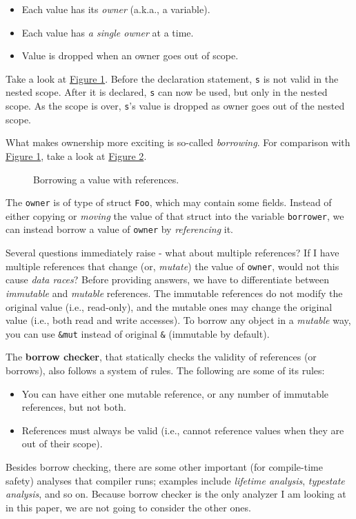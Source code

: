 \begin{itemize}
    \item Each value has its \textit{owner} (a.k.a., a variable).
    \item Each value has \textit{a single owner} at a time.
    \item Value is dropped when an owner goes out of scope.
\end{itemize}

Take a look at \hyperref[rustex1]{Figure 1}. Before the declaration statement,
\texttt{s} is not valid in the nested scope. After it is declared, 
\texttt{s} can now be used, but only in the nested scope. As the scope
is over, \texttt{s}'s value is dropped as owner goes out of the nested scope.

What makes ownership more exciting is so-called \textit{borrowing}. For comparison
with \hyperref[rustex1]{Figure 1}, take a look at \hyperref[rustex2]{Figure 2}.

\begin{figure*}[ht]
    \begin{center}
    
    \end{center}
    \caption{Borrowing a value with references.}
    \label{rustex2}
\end{figure*}

The \texttt{owner} is of type of struct \texttt{Foo}, which may contain some fields.
Instead of either copying or \textit{moving} the value of that struct into the variable
\texttt{borrower}, we can instead borrow a value of \texttt{owner} by \textit{referencing}
it.

Several questions immediately raise - what about multiple references? If I have 
multiple references that change (or, \textit{mutate}) the value of \texttt{owner},
would not this cause \textit{data races}? Before providing answers, we have to differentiate
between \textit{immutable} and \textit{mutable} references. The immutable references do not
modify the original value (i.e., read-only), and the mutable ones may
change the original value (i.e., both read and write accesses). To borrow
any object in a \textit{mutable} way, you can use \texttt{\&mut} instead of
original \texttt{\&} (immutable by default).

The \textbf{borrow checker}, that statically checks the validity of references (or borrows),
also follows a system of rules. The following are some of its rules:

\begin{itemize}
    \item You can have either one mutable reference, or any number of immutable references,
          but not both.
    \item References must always be valid (i.e., cannot reference values when they are out
         of their scope).
\end{itemize}

Besides borrow checking, there are some other important (for compile-time safety)
analyses that compiler runs; examples include \textit{lifetime analysis}, \textit{typestate
analysis}, and so on. Because borrow checker is the only analyzer I am looking at
in this paper, we are not going to consider the other ones.
